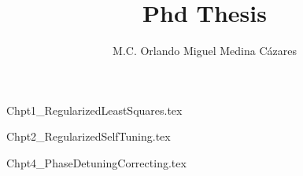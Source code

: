 \documentclass[letterpaper,11pt]{book}
\title{Phd Thesis}
\author{M.C. Orlando Miguel Medina C\'azares}
\begin{document}
\maketitle


\clearpage
\thispagestyle{empty}

\tableofcontents
{}
\listoffigures

\mainmatter
{Chpt1_RegularizedLeastSquares.tex}

{Chpt2_RegularizedSelfTuning.tex}

{Chpt4_PhaseDetuningCorrecting.tex}

\end{document}
